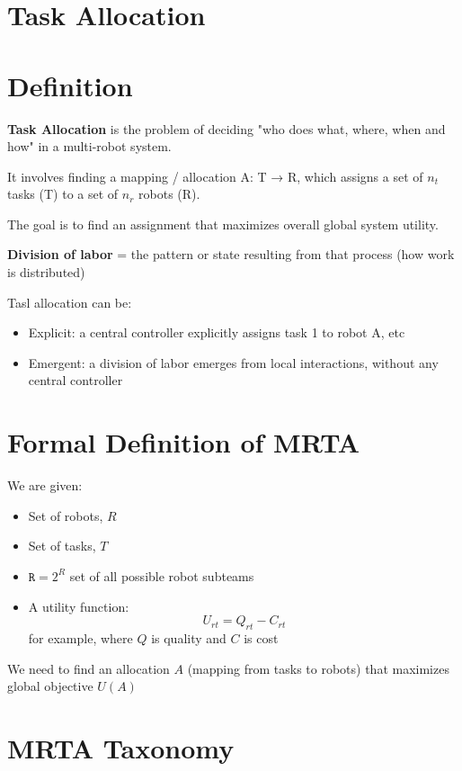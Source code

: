 \section*{Task Allocation}

\vspace{-0.5cm}

\section*{Definition}

\textbf{Task Allocation} is the problem of deciding "who does what, where, when and how" in a multi-robot system.

It involves finding a mapping / allocation A: T → R, which assigns a set of $n_t$ tasks (T) to a set of $n_r$ robots (R).

The goal is to find an assignment that maximizes overall global system utility.

\textbf{Division of labor} = the pattern or state resulting from that process (how work is distributed)

Tasl allocation can be:
\begin{itemize}
    \item Explicit: a central controller explicitly assigns task 1 to robot A, etc 
    \item Emergent: a division of labor emerges from local interactions, without any central controller
\end{itemize}

\section*{Formal Definition of MRTA}

We are given:
\begin{itemize}
    \item Set of robots, $R$
    \item Set of tasks, $T$
    \item $\mathtt{R} = 2^R$ set of all possible robot subteams
    \item A utility function:
    \[U_{rt} = Q_{rt} - C_{rt}\] for example, where $Q$ is quality and $C$ is cost
\end{itemize}

We need to find an allocation $A$ (mapping from tasks to robots) that maximizes 
global objective $U(A)$

\section*{MRTA Taxonomy}

